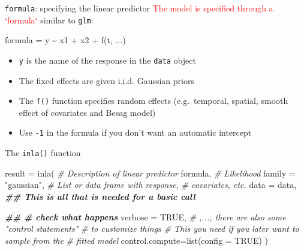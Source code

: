 \documentclass[
  ignorenonframetext,
]{beamer}
\newenvironment{Shaded}{\begin{snugshade}}{\end{snugshade}}
\newcommand{\AttributeTok}[1]{\textcolor[rgb]{0.77,0.63,0.00}{#1}}
\newcommand{\CommentTok}[1]{\textcolor[rgb]{0.56,0.35,0.01}{\textit{#1}}}
\newcommand{\ConstantTok}[1]{\textcolor[rgb]{0.00,0.00,0.00}{#1}}
\newcommand{\DocumentationTok}[1]{\textcolor[rgb]{0.56,0.35,0.01}{\textbf{\textit{#1}}}}
\newcommand{\FunctionTok}[1]{\textcolor[rgb]{0.00,0.00,0.00}{#1}}
\newcommand{\NormalTok}[1]{#1}
\newcommand{\OtherTok}[1]{\textcolor[rgb]{0.56,0.35,0.01}{#1}}
\newcommand{\SpecialCharTok}[1]{\textcolor[rgb]{0.00,0.00,0.00}{#1}}
\newcommand{\StringTok}[1]{\textcolor[rgb]{0.31,0.60,0.02}{#1}}
\begin{document}
\begin{frame}[fragile]{\texttt{formula}: specifying the linear
predictor}
\protect\hypertarget{formula-specifying-the-linear-predictor}{}
\textcolor{red}{The model is specified through a `formula`} similar to
\texttt{glm}:

\begin{Shaded}
\begin{Highlighting}[]
\NormalTok{formula }\OtherTok{=}\NormalTok{ y }\SpecialCharTok{\textasciitilde{}}\NormalTok{ x1 }\SpecialCharTok{+}\NormalTok{ x2 }\SpecialCharTok{+} \FunctionTok{f}\NormalTok{(t, ...)}
\end{Highlighting}
\end{Shaded}

\begin{itemize}
\item
  \texttt{y} is the name of the response in the \texttt{data} object
\item
  The fixed effects are given i.i.d. Gaussian priors
\item
  The \texttt{f()} function specifies random effects (e.g.~temporal,
  spatial, smooth effect of covariates and Besag model)
\item
  Use \texttt{-1} in the formula if you don't want an automatic
  intercept
\end{itemize}
\end{frame}

\begin{frame}[fragile]{The \texttt{inla()} function}
\protect\hypertarget{the-inla-function}{}
\small

\begin{Shaded}
\begin{Highlighting}[]
\NormalTok{result }\OtherTok{=} \FunctionTok{inla}\NormalTok{(}
  \CommentTok{\# Description of linear predictor}
\NormalTok{  formula,}
  \CommentTok{\# Likelihood}
  \AttributeTok{family =} \StringTok{"gaussian"}\NormalTok{,}
  \CommentTok{\# List or data frame with response, }
  \CommentTok{\# covariates, etc. }
  \AttributeTok{data =}\NormalTok{ data,}
  \DocumentationTok{\#\# This is all that is needed for a basic call }

  \DocumentationTok{\#\# \# check what happens}
  \AttributeTok{verbose =} \ConstantTok{TRUE}\NormalTok{,}
  \CommentTok{\# ,..., there are also some "control statements"}
  \CommentTok{\# to customize things}
  \CommentTok{\# This you need if you later want to sample from the}
  \CommentTok{\# fitted model}
  \AttributeTok{control.compute=}\FunctionTok{list}\NormalTok{(}\AttributeTok{config =} \ConstantTok{TRUE}\NormalTok{)}
\NormalTok{  )}
\end{Highlighting}
\end{Shaded}

\normalsize
\end{frame}
\end{document}
